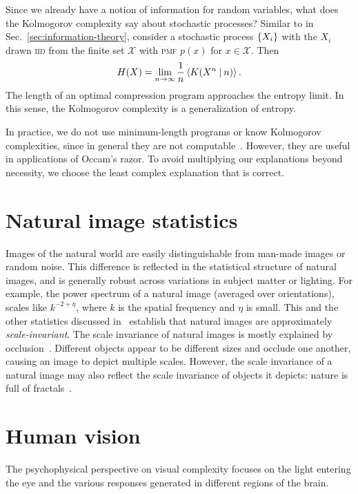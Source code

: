 \documentclass[aps,reprint,floatfix]{revtex4-2}
\theoremstyle{plain}
\theoremstyle{definition}
\begin{document}
Since we already have a notion of information for random variables, what does
the Kolmogorov complexity say about stochastic processes? Similar to in
Sec.~\ref{sec:information-theory}, consider a stochastic process $\qty{X_i}$
with the $X_i$ drawn \textsc{iid} from the finite set $\mathcal{X}$ with
\textsc{pmf} $p(x)$ for $x \in \mathcal{X}$. Then~\cite[p.~473]{cover}
\begin{equation}
  H(X)
  = \lim_{n \to \infty} \frac{1}{n}\ev{K(X^n \mathbin{|} n)}.
  \label{eq:complexity-entropy}
\end{equation}
The length of an optimal compression program approaches the entropy limit. In
this sense, the Kolmogorov complexity is a generalization of entropy.

In practice, we do not use minimum-length programs or know Kolmogorov
complexities, since in general they are not computable~\cite[p.~482]{cover}.
However, they are useful in applications of Occam's razor. To avoid multiplying
our explanations beyond necessity, we choose the least complex explanation that
is correct.

\section{Natural image statistics}\label{sec:natstat}

Images of the natural world are easily distinguishable from man-made images or
random noise. This difference is reflected in the statistical structure of
natural images, and is generally robust across variations in subject matter or
lighting. For example, the power spectrum of a natural image (averaged over
orientations), scales like $k^{-2 + \eta}$, where $k$ is the spatial frequency
and $\eta$ is small. This and the other statistics discussed in~\cite{ruderman}
establish that natural images are approximately \emph{scale-invariant}. The
scale invariance of natural images is mostly explained by
occlusion~\cite{dead-leaves}. Different objects appear to be different sizes and
occlude one another, causing an image to depict multiple scales. However, the
scale invariance of a natural image may also reflect the scale invariance of
objects it depicts: nature is full of fractals~\cite{fractals-everywhere}.

\section{Human vision}\label{sec:vision}

The psychophysical perspective on visual complexity focuses on the light
entering the eye and the various responses generated in different regions of the
brain.
\end{document}
